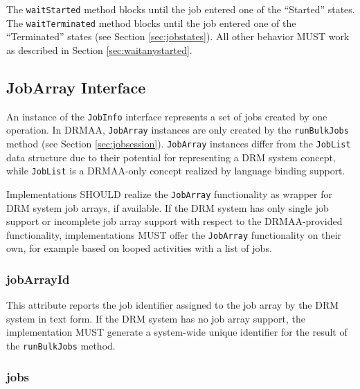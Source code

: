 \documentclass{article}
\newcommand{\h}[1]{\lstinline|#1|}
\newcommand{\rat}[1]{}
\begin{document}
The \h{waitStarted} method blocks until the job entered one of the \enquote{Started} states. The \h{waitTerminated} method blocks until the job entered one of the \enquote{Terminated} states (see Section \ref{sec:jobstates}). All other behavior MUST work as described in Section \ref{sec:waitanystarted}.

\subsection{JobArray Interface}
\label{sec:jobarray}

 An instance of the \h{JobInfo} interface represents a set of jobs created by one operation. In DRMAA, \h{JobArray} instances are only created by the \h{runBulkJobs} method (see Section \ref{sec:jobsession}). \h{JobArray} instances differ from the \h{JobList} data structure due to their potential for representing a DRM system concept, while \h{JobList} is a DRMAA-only concept realized by language binding support.

Implementations SHOULD realize the \h{JobArray} functionality as wrapper for DRM system job arrays, if available. If the DRM system has only single job support or incomplete job array support with respect to the DRMAA-provided functionality, implementations MUST offer the \h{JobArray} functionality on their own, for example based on looped activities with a list of jobs.



\rat{
We are aware of the fact that some systems (e.g., LSF at the time of writing) do not support all DRMAA control methods offered for job arrays. Since we intended to avoid optional DRMAA methods wherever we could, the text here mandates the implementation to simulate the array support on its own. For example, looping over all jobs in the array and calling \enquote{suspend} for each one is trivial to implement and fulfills the same purpose.
} 

\subsubsection{jobArrayId}

This attribute reports the job identifier assigned to the job array by the DRM system in text form. If the DRM system has no job array support, the implementation MUST generate a system-wide unique identifier for the result of the \h{runBulkJobs} method.

\subsubsection{jobs}
\end{document}
